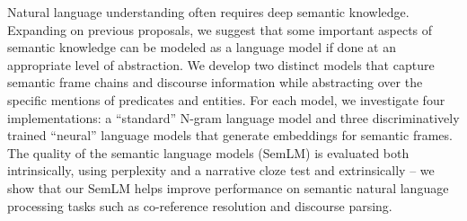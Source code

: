 Natural language understanding often requires deep semantic knowledge. Expanding on previous proposals, we suggest that some important aspects of semantic knowledge can be modeled as a language model if done at an appropriate level of abstraction. We develop two distinct models that capture semantic frame chains and discourse information while abstracting over the specific mentions of predicates and entities. For each model, we investigate four implementations: a ``standard'' N-gram language model and three discriminatively trained ``neural'' language models that generate embeddings for semantic frames. The quality of the semantic language models (SemLM) is evaluated both intrinsically, using perplexity and a narrative cloze test and extrinsically -- we show that our SemLM helps improve performance on semantic natural language processing tasks such as co-reference resolution and discourse parsing.
